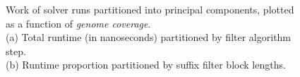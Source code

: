 \begin{figure}
\centering
{}
\caption[Work time of \aspop{} solver runs partitioned into principal components, plotted as a function of \textit{genome coverage}]{Work of \aspop{} solver runs partitioned into principal components, plotted as a function of \textit{genome coverage}.\\(a) Total runtime (in nanoseconds) partitioned by filter algorithm step.\\(b) Runtime proportion partitioned by suffix filter block lengths.}
\label{fig:cov}
\end{figure}



